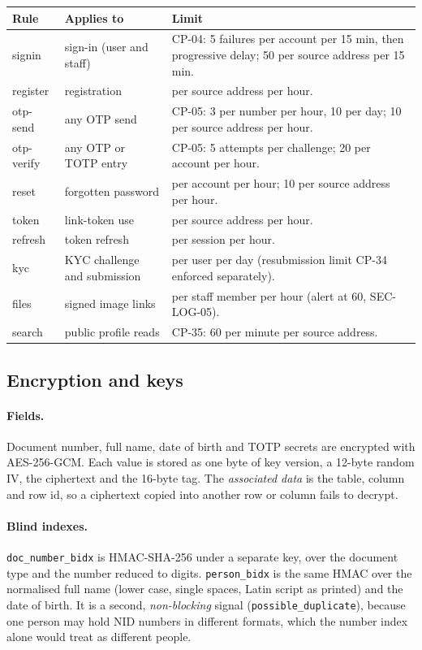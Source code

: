 \documentclass[11pt,a4paper]{article}
\newenvironment{dtable}[1]{\small\begin{longtable}{#1}}{\end{longtable}}
\begin{document}
\begin{dtable}{@{}>{\ttfamily}p{2.2cm}>{\raggedright\arraybackslash}p{5.2cm}>{\raggedright\arraybackslash}p{7.8cm}@{}}
\toprule
\textnormal{\textbf{Rule}} & \textbf{Applies to} & \textbf{Limit} \\ \midrule \endhead
signin & sign-in (user and staff) & CP-04: 5 failures per account per 15 min, then progressive delay; 50 per source address per 15 min. \\
register & registration & 5 per source address per hour. \\
otp-send & any OTP send & CP-05: 3 per number per hour, 10 per day; 10 per source address per hour. \\
otp-verify & any OTP or TOTP entry & CP-05: 5 attempts per challenge; 20 per account per hour. \\
reset & forgotten password & 3 per account per hour; 10 per source address per hour. \\
token & link-token use & 20 per source address per hour. \\
refresh & token refresh & 60 per session per hour. \\
kyc & KYC challenge and submission & 10 per user per day (resubmission limit CP-34 enforced separately). \\
files & signed image links & 120 per staff member per hour (alert at 60, SEC-LOG-05). \\
search & public profile reads & CP-35: 60 per minute per source address. \\
\bottomrule
\end{dtable}

\subsection{Encryption and keys}
\label{sec:keys}
\paragraph{Fields.} Document number, full name, date of birth and TOTP secrets are encrypted with AES-256-GCM. Each value is stored as one byte of key version, a 12-byte random IV, the ciphertext and the 16-byte tag. The \emph{associated data} is the table, column and row id, so a ciphertext copied into another row or column fails to decrypt.

\paragraph{Blind indexes.} \texttt{doc\_number\_bidx} is HMAC-SHA-256 under a separate key, over the document type and the number reduced to digits. \texttt{person\_bidx} is the same HMAC over the normalised full name (lower case, single spaces, Latin script as printed) and the date of birth. It is a second, \emph{non-blocking} signal (\texttt{possible\_duplicate}), because one person may hold NID numbers in different formats, which the number index alone would treat as different people.
\end{document}
